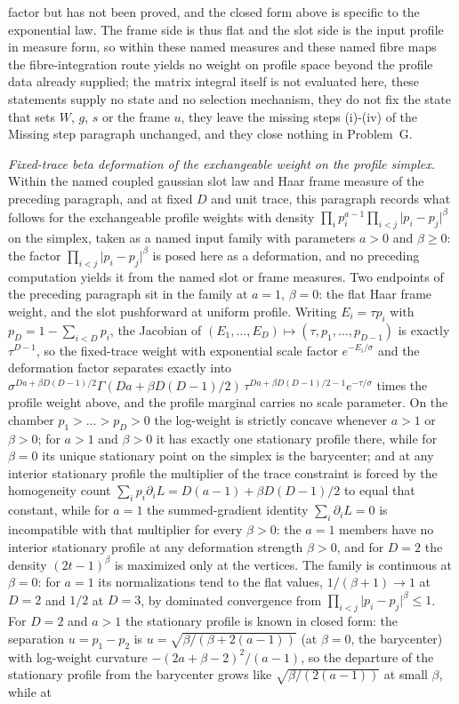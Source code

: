 factor but has not been proved, and the closed form above is specific to the exponential law. The frame side is thus flat and the slot side is the input profile in measure form, so within these named measures and these named fibre maps the fibre-integration route yields no weight on profile space beyond the profile data already supplied; the matrix integral itself is not evaluated here, these statements supply no state and no selection mechanism, they do not fix the state that sets \(W\), \(g\), \(s\) or the frame \(u\), they leave the missing steps (i)-(iv) of the Missing step paragraph unchanged, and they close nothing in Problem~G.

\emph{Fixed-trace beta deformation of the exchangeable weight on the profile simplex.} Within the named coupled gaussian slot law and Haar frame measure of the preceding paragraph, and at fixed \(D\) and unit trace, this paragraph records what follows for the exchangeable profile weights with density \(\prod_{i}p_{i}^{a-1}\prod_{i<j}\lvert p_{i}-p_{j}\rvert^{\beta}\) on the simplex, taken as a named input family with parameters \(a>0\) and \(\beta\ge 0\): the factor \(\prod_{i<j}\lvert p_{i}-p_{j}\rvert^{\beta}\) is posed here as a deformation, and no preceding computation yields it from the named slot or frame measures. Two endpoints of the preceding paragraph sit in the family at \(a=1\), \(\beta=0\): the flat Haar frame weight, and the slot pushforward at uniform profile. Writing \(E_{i}=\tau p_{i}\) with \(p_{D}=1-\sum_{i<D}p_{i}\), the Jacobian of \((E_{1},\dots,E_{D})\mapsto(\tau,p_{1},\dots,p_{D-1})\) is exactly \(\tau^{D-1}\), so the fixed-trace weight with exponential scale factor \(e^{-E_{i}/\sigma}\) and the deformation factor separates exactly into \(\sigma^{Da+\beta D(D-1)/2}\Gamma(Da+\beta D(D-1)/2)\,\tau^{Da+\beta D(D-1)/2-1}e^{-\tau/\sigma}\) times the profile weight above, and the profile marginal carries no scale parameter. On the chamber \(p_{1}>\dots>p_{D}>0\) the log-weight is strictly concave whenever \(a>1\) or \(\beta>0\); for \(a>1\) and \(\beta>0\) it has exactly one stationary profile there, while for \(\beta=0\) its unique stationary point on the simplex is the barycenter; and at any interior stationary profile the multiplier of the trace constraint is forced by the homogeneity count \(\sum_{i}p_{i}\partial_{i}L=D(a-1)+\beta D(D-1)/2\) to equal that constant, while for \(a=1\) the summed-gradient identity \(\sum_{i}\partial_{i}L=0\) is incompatible with that multiplier for every \(\beta>0\): the \(a=1\) members have no interior stationary profile at any deformation strength \(\beta>0\), and for \(D=2\) the density \((2t-1)^{\beta}\) is maximized only at the vertices. The family is continuous at \(\beta=0\): for \(a=1\) its normalizations tend to the flat values, \(1/(\beta+1)\to 1\) at \(D=2\) and \(1/2\) at \(D=3\), by dominated convergence from \(\prod_{i<j}\lvert p_{i}-p_{j}\rvert^{\beta}\le 1\). For \(D=2\) and \(a>1\) the stationary profile is known in closed form: the separation \(u=p_{1}-p_{2}\) is \(u=\sqrt{\beta/(\beta+2(a-1))}\) (at \(\beta=0\), the barycenter) with log-weight curvature \(-(2a+\beta-2)^{2}/(a-1)\), so the departure of the stationary profile from the barycenter grows like \(\sqrt{\beta/(2(a-1))}\) at small \(\beta\), while at 